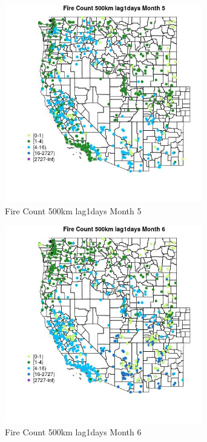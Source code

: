 \begin{figure} 
\centering  
\includegraphics[width=0.77\textwidth]{Code_Outputs/Report_ML_input_PM25_Step4_part_f_de_duplicated_aveswNAs_MapObsMo5Fire_Count_500km_lag1days.jpg} 
\caption{\label{fig:Report_ML_input_PM25_Step4_part_f_de_duplicated_aveswNAsMapObsMo5Fire_Count_500km_lag1days}Fire Count 500km lag1days Month 5} 
\end{figure} 
 

\begin{figure} 
\centering  
\includegraphics[width=0.77\textwidth]{Code_Outputs/Report_ML_input_PM25_Step4_part_f_de_duplicated_aveswNAs_MapObsMo6Fire_Count_500km_lag1days.jpg} 
\caption{\label{fig:Report_ML_input_PM25_Step4_part_f_de_duplicated_aveswNAsMapObsMo6Fire_Count_500km_lag1days}Fire Count 500km lag1days Month 6} 
\end{figure} 
 

